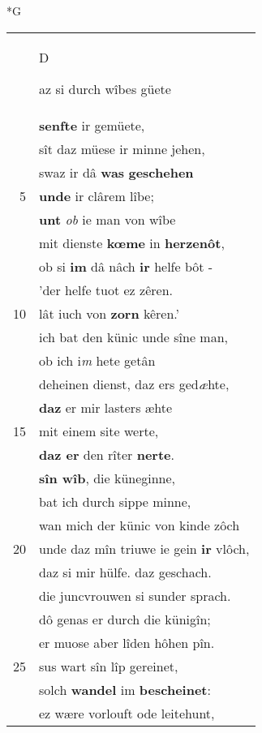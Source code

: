 \documentclass[8pt,a4paper,notitlepage]{article}
\begin{document}
\newpage
\begin{table}[ht]
\begin{minipage}[t]{0.5\linewidth}
\small
\begin{center}*G
\end{center}
\begin{tabular}{rl}
 & \begin{large}D\end{large}az si durch wîbes güete\\ 
 & \textbf{senfte} ir gemüete,\\ 
 & sît daz  müese ir minne jehen,\\ 
 & swaz ir dâ \textbf{was} \textbf{geschehen}\\ 
5 & \textbf{unde} ir clârem lîbe;\\ 
 & \textbf{unt} \textit{ob} ie man von wîbe\\ 
 & mit dienste \textbf{kœme} in \textbf{herzenôt},\\ 
 & ob si \textbf{im} dâ nâch \textbf{ir} helfe bôt -\\ 
 & 'der helfe tuot ez zêren.\\ 
10 & lât iuch von \textbf{zorn} kêren.'\\ 
 & ich bat den künic unde sîne man,\\ 
 & ob ich i\textit{m} hete getân\\ 
 & deheinen dienst, daz ers ged\textit{æ}hte,\\ 
 & \textbf{daz} er mir lasters æhte\\ 
15 & mit einem site werte,\\ 
 & \textbf{daz er} den rîter \textbf{nerte}.\\ 
 & \textbf{sîn wîb}, die küneginne,\\ 
 & bat ich durch sippe minne,\\ 
 & wan mich der künic von kinde zôch\\ 
20 & unde daz mîn triuwe ie gein \textbf{ir} vlôch,\\ 
 & daz si mir hülfe. daz geschach.\\ 
 & die juncvrouwen si sunder sprach.\\ 
 & dô genas er durch die künigîn;\\ 
 & er muose aber lîden hôhen pîn.\\ 
25 & sus wart sîn lîp gereinet,\\ 
 & solch \textbf{wandel} im \textbf{bescheinet}:\\ 
 & ez wære vorlouft ode leitehunt,\\ 

\end{tabular}
\end{minipage}
\end{table}
\end{document}
